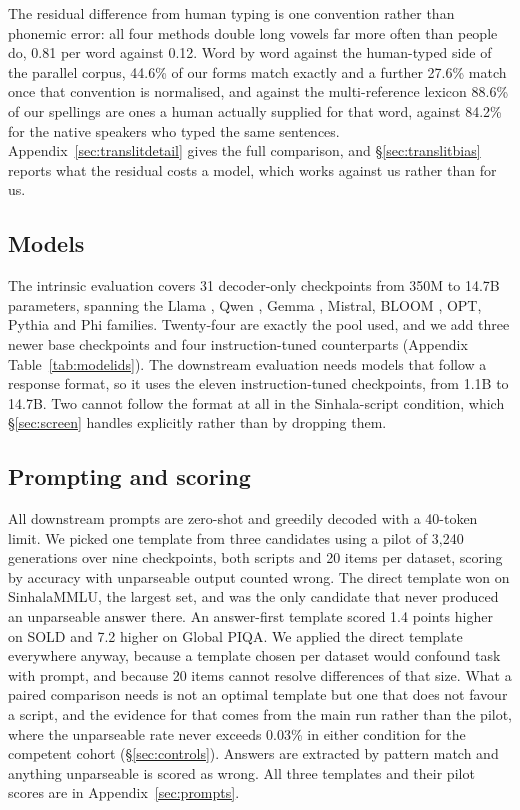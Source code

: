 \documentclass[11pt]{article}
\begin{document}
The residual difference from human typing is one convention rather than phonemic
error: all four methods double long vowels far more often than people do, 0.81 per
word against 0.12. Word by word against the human-typed side of the parallel
corpus, 44.6\% of our forms match exactly and a further 27.6\% match once that
convention is normalised, and against the multi-reference lexicon 88.6\% of our
spellings are ones a human actually supplied for that word, against 84.2\% for the
native speakers who typed the same sentences. Appendix~\ref{sec:translitdetail}
gives the full comparison, and \S\ref{sec:translitbias} reports what the residual
costs a model, which works against us rather than for us.

\subsection{Models}

The intrinsic evaluation covers 31 decoder-only checkpoints from 350M to 14.7B
parameters, spanning the Llama \citep{grattafiori-etal-2024-llama3}, Qwen
\citep{yang-etal-2024-qwen2, yang-etal-2025-qwen3}, Gemma
\citep{gemmateam-2024-gemma2}, Mistral, BLOOM \citep{lescao-etal-2023-bloom}, OPT,
Pythia \citep{biderman-etal-2023-pythia} and Phi \citep{abdin-etal-2024-phi4}
families. Twenty-four are exactly the pool
\citet{rajapakse-weerasinghe-2026-script} used, and we add three newer base
checkpoints and four instruction-tuned counterparts
(Appendix Table~\ref{tab:modelids}). The downstream evaluation needs models that
follow a response format, so it uses the eleven instruction-tuned checkpoints, from
1.1B to 14.7B. Two cannot follow the format at all in the Sinhala-script condition,
which \S\ref{sec:screen} handles explicitly rather than by dropping them.

\subsection{Prompting and scoring}
\label{sec:prompting}

All downstream prompts are zero-shot and greedily decoded with a 40-token limit.
We picked one template from three candidates using a pilot of 3{,}240 generations
over nine checkpoints, both scripts and 20 items per dataset, scoring by accuracy
with unparseable output counted wrong. The direct template won on SinhalaMMLU, the
largest set, and was the only candidate that never produced an unparseable answer
there. An answer-first template scored 1.4 points higher on SOLD and 7.2 higher on
Global PIQA. We applied the direct template everywhere anyway, because a template
chosen per dataset would confound task with prompt, and because 20 items cannot
resolve differences of that size. What a paired comparison needs is not an optimal
template but one that does not favour a script, and the evidence for that comes from
the main run rather than the pilot, where the unparseable rate never exceeds 0.03\%
in either condition for the competent cohort (\S\ref{sec:controls}). Answers are
extracted by pattern match and anything unparseable is scored as wrong. All three
templates and their pilot scores are in Appendix~\ref{sec:prompts}.
\end{document}
